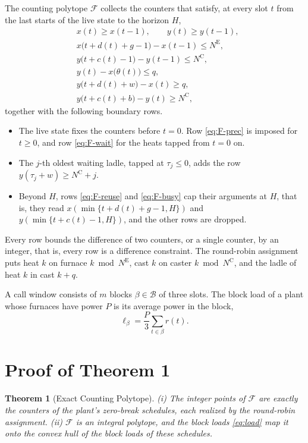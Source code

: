 \documentclass[11pt]{article}
\newtheorem{theorem}{Theorem}
\newcommand{\NE}{N^{\mathrm{E}}}
\newcommand{\NC}{N^{\mathrm{C}}}
\newcommand{\calF}{\mathcal{F}}
\newcommand{\calB}{\mathcal{B}}
\begin{document}
The counting polytope $\calF$ collects the counters that satisfy, at every slot $t$ from the last starts of the live
state to the horizon $H$,
\begin{subequations}\label{eq:F}
\begin{align}
& x(t)\ge x(t-1),\qquad y(t)\ge y(t-1), \label{eq:F-mono}\\
& x\big(t+d(t)+g-1\big)-x(t-1)\le\NE, \label{eq:F-reuse}\\
& y\big(t+c(t)-1\big)-y(t-1)\le\NC, \label{eq:F-busy}\\
& y(t)-x\big(\theta(t)\big)\le q, \label{eq:F-prec}\\
& y\big(t+d(t)+w\big)-x(t)\ge q, \label{eq:F-wait}\\
& y\big(t+c(t)+b\big)-y(t)\ge\NC, \label{eq:F-nobreak}
\end{align}
\end{subequations}
together with the following boundary rows.
\begin{itemize}[leftmargin=1.5em]
\item The live state fixes the counters before $t=0$. Row \eqref{eq:F-prec} is imposed for $t\ge0$, and row
\eqref{eq:F-wait} for the heats tapped from $t=0$ on.
\item The $j$-th oldest waiting ladle, tapped at $\tau_j\le0$, adds the row $y(\tau_j+w)\ge\NC+j$.
\item Beyond $H$, rows \eqref{eq:F-reuse} and \eqref{eq:F-busy} cap their arguments at $H$, that is, they read
$x(\min\{t+d(t)+g-1,H\})$ and $y(\min\{t+c(t)-1,H\})$, and the other rows are dropped.
\end{itemize}
Every row bounds the difference of two counters, or a single counter, by an integer, that is, every row is a
difference constraint. The round-robin assignment puts heat $k$ on furnace $k\bmod\NE$, cast $k$ on caster $k\bmod\NC$,
and the ladle of heat $k$ in cast $k+q$.

A call window consists of $m$ blocks $\beta\in\calB$ of three slots. The block load of a plant whose furnaces have power
$P$ is its average power in the block,
\begin{equation}\label{eq:load}
\ell_\beta=\frac P3\sum_{t\in\beta}r(t).
\end{equation}

\section{Proof of Theorem 1}\label{sec:thm1}

\begin{theorem}[Exact Counting Polytope]
(i) The integer points of $\calF$ are exactly the counters of the plant's zero-break schedules, each realized by the
round-robin assignment. (ii) $\calF$ is an integral polytope, and the block loads \eqref{eq:load} map it onto the convex
hull of the block loads of these schedules.
\end{theorem}
\end{document}
